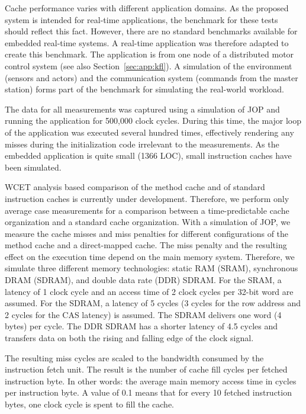 Cache performance varies with different application domains. As the
proposed system is intended for real-time applications, the
benchmark for these tests should reflect this fact. However, there
are no standard benchmarks available for embedded real-time systems.
A real-time application was therefore adapted to create this
benchmark. The application is from one node of a distributed motor
control system \cite{jop:wises03} (see also
Section~\ref{sec:app:kfl}). A simulation of the environment (sensors
and actors) and the communication system (commands from the master
station) forms part of the benchmark for simulating the real-world
workload.

The data for all measurements was captured using a simulation of JOP
and running the application for 500,000 clock cycles. During this
time, the major loop of the application was executed several hundred
times, effectively rendering any misses during the initialization
code irrelevant to the measurements. As the embedded application is
quite small (1366 LOC), small instruction caches have been simulated.

WCET analysis based comparison of the method cache and of standard
instruction caches is currently under development. Therefore, we
perform only average case measurements for a comparison between a
time-predictable cache organization and a standard cache
organization. With a simulation of JOP, we measure the cache misses
and miss penalties for different configurations of the method cache
and a direct-mapped cache. The miss penalty and the resulting effect
on the execution time depend on the main memory system. Therefore, we
simulate three different memory technologies: static RAM (SRAM),
synchronous DRAM (SDRAM), and double data rate (DDR) SDRAM. For the
SRAM, a latency of 1 clock cycle and an access time of 2 clock cycles
per 32-bit word are assumed. For the SDRAM, a latency of 5 cycles (3
cycles for the row address and 2 cycles for the CAS latency) is
assumed. The SDRAM delivers one word (4 bytes) per cycle. The DDR
SDRAM has a shorter latency of 4.5 cycles and transfers data on both
the rising and falling edge of the clock signal.

The resulting miss cycles are scaled to the bandwidth consumed by the
instruction fetch unit. The result is the number of cache fill cycles
per fetched instruction byte. In other words: the average main memory
access time in cycles per instruction byte. A value of 0.1 means that
for every 10 fetched instruction bytes, one clock cycle is spent to
fill the cache.

